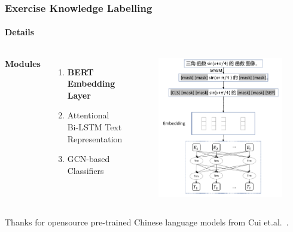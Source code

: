 \documentclass{beamer}
\begin{document}
\begin{frame}
  \frametitle{Exercise Knowledge Labelling}
  \framesubtitle{Details}
  \begin{columns}[c] %
    \textbf{Modules}
    \begin{enumerate}
      \item \textbf{BERT~\cite{devlin2019bert} Embedding Layer}
      \item Attentional Bi-LSTM Text Representation
      \item GCN-based Classifiers
    \end{enumerate}
    \begin{figure}
      \includegraphics[width=1.0\textwidth]{figures/ch2-bert-model.pdf}
    \end{figure}
  \end{columns}
  Thanks for opensource pre-trained Chinese language models from Cui et.al.~\cite{wwmbertgithub,chinese-bert-wwm}.
\end{frame}
\end{document}
